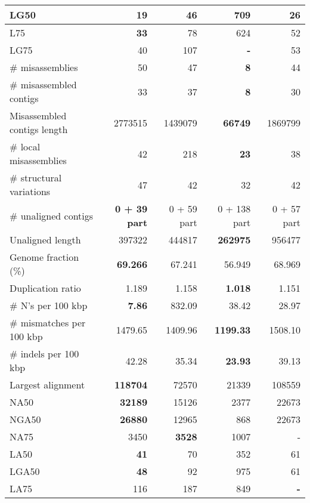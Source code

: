 \documentclass[12pt,a4paper]{article}
\begin{document}
\begin{table}[ht]
\begin{center}
\begin{tabular}{|l*{4}{|r}|}
LG50 & {\bf 19} & 46 & 709 & 26 \\ \hline
L75 & {\bf 33} & 78 & 624 & 52 \\ \hline
LG75 & 40 & 107 & {\bf -} & 53 \\ \hline
\# misassemblies & 50 & 47 & {\bf 8} & 44 \\ \hline
\# misassembled contigs & 33 & 37 & {\bf 8} & 30 \\ \hline
Misassembled contigs length & 2773515 & 1439079 & {\bf 66749} & 1869799 \\ \hline
\# local misassemblies & 42 & 218 & {\bf 23} & 38 \\ \hline
\# structural variations & 47 & 42 & 32 & 42 \\ \hline
\# unaligned contigs & {\bf 0 + 39 part} & 0 + 59 part & 0 + 138 part & 0 + 57 part \\ \hline
Unaligned length & 397322 & 444817 & {\bf 262975} & 956477 \\ \hline
Genome fraction (\%) & {\bf 69.266} & 67.241 & 56.949 & 68.969 \\ \hline
Duplication ratio & 1.189 & 1.158 & {\bf 1.018} & 1.151 \\ \hline
\# N's per 100 kbp & {\bf 7.86} & 832.09 & 38.42 & 28.97 \\ \hline
\# mismatches per 100 kbp & 1479.65 & 1409.96 & {\bf 1199.33} & 1508.10 \\ \hline
\# indels per 100 kbp & 42.28 & 35.34 & {\bf 23.93} & 39.13 \\ \hline
Largest alignment & {\bf 118704} & 72570 & 21339 & 108559 \\ \hline
NA50 & {\bf 32189} & 15126 & 2377 & 22673 \\ \hline
NGA50 & {\bf 26880} & 12965 & 868 & 22673 \\ \hline
NA75 & 3450 & {\bf 3528} & 1007 & - \\ \hline
LA50 & {\bf 41} & 70 & 352 & 61 \\ \hline
LGA50 & {\bf 48} & 92 & 975 & 61 \\ \hline
LA75 & 116 & 187 & 849 & {\bf -} \\ \hline
\end{tabular}
\end{center}
\end{table}
\end{document}
